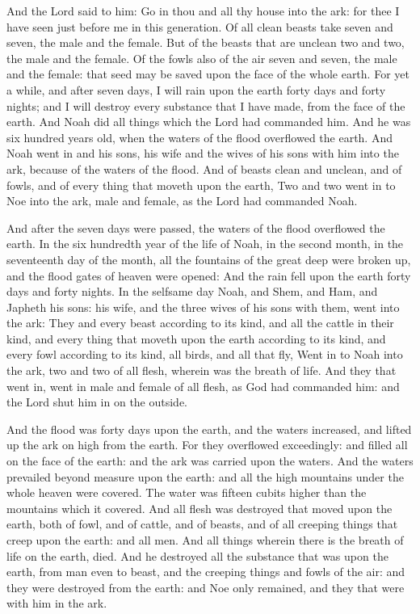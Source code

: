 And the Lord said to him: Go in thou and all thy house into the ark: for thee I have seen just before me in this
generation. Of all clean beasts take seven and seven, the male and the female. But of the beasts that are unclean two
and two, the male and the female. Of the fowls also of the air seven and seven, the male and the female: that seed may
be saved upon the face of the whole earth. For yet a while, and after seven days, I will rain upon the earth forty days
and forty nights; and I will destroy every substance that I have made, from the face of the earth. And Noah did all
things which the Lord had commanded him. And he was six hundred years old, when the waters of the flood overflowed the
earth. And Noah went in and his sons, his wife and the wives of his sons with him into the ark, because of the waters
of the flood. And of beasts clean and unclean, and of fowls, and of every thing that moveth upon the earth, Two and two
went in to Noe into the ark, male and female, as the Lord had commanded Noah.

And after the seven days were passed, the waters of the flood overflowed the earth. In the six hundredth year of the
life of Noah, in the second month, in the seventeenth day of the month, all the fountains of the great deep were broken
up, and the flood gates of heaven were opened: And the rain fell upon the earth forty days and forty nights. In the
selfsame day Noah, and Shem, and Ham, and Japheth his sons: his wife, and the three wives of his sons with them, went
into the ark: They and every beast according to its kind, and all the cattle in their kind, and every thing that moveth
upon the earth according to its kind, and every fowl according to its kind, all birds, and all that fly, Went in to
Noah into the ark, two and two of all flesh, wherein was the breath of life. And they that went in, went in male and
female of all flesh, as God had commanded him: and the Lord shut him in on the outside.

And the flood was forty days upon the earth, and the waters increased, and lifted up the ark on high from the earth. For
they overflowed exceedingly: and filled all on the face of the earth: and the ark was carried upon the waters. And the
waters prevailed beyond measure upon the earth: and all the high mountains under the whole heaven were covered. The
water was fifteen cubits higher than the mountains which it covered. And all flesh was destroyed that moved upon the
earth, both of fowl, and of cattle, and of beasts, and of all creeping things that creep upon the earth: and all men.
And all things wherein there is the breath of life on the earth, died. And he destroyed all the substance that was upon
the earth, from man even to beast, and the creeping things and fowls of the air: and they were destroyed from the
earth: and Noe only remained, and they that were with him in the ark.

